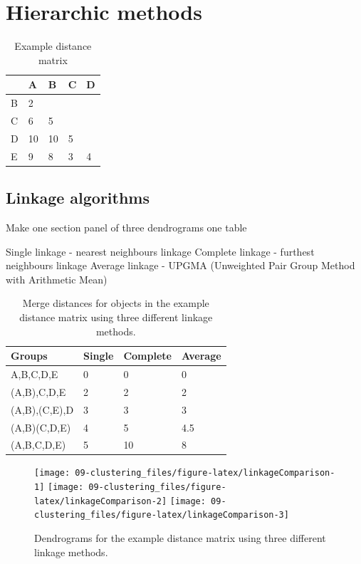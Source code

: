 \documentclass[]{book}
\theoremstyle{definition}
\theoremstyle{definition}
\theoremstyle{definition}
\theoremstyle{remark}
\begin{document}
\section{Hierarchic methods}\label{hierarchic-methods}

\begin{table}

\caption{\label{tab:distance-matrix}Example distance matrix}
\centering
\begin{tabular}[t]{lllll}
\toprule
  & A & B & C & D\\
\midrule
B & 2 &  &  & \\
C & 6 & 5 &  & \\
D & 10 & 10 & 5 & \\
E & 9 & 8 & 3 & 4\\
\bottomrule
\end{tabular}
\end{table}

\subsection{Linkage algorithms}\label{linkage-algorithms}

Make one section panel of three dendrograms one table

Single linkage - nearest neighbours linkage Complete linkage - furthest
neighbours linkage Average linkage - UPGMA (Unweighted Pair Group Method
with Arithmetic Mean)

\begin{table}

\caption{\label{tab:distance-merge}Merge distances for objects in the example distance matrix using three different linkage methods.}
\centering
\begin{tabular}[t]{llll}
\toprule
Groups & Single & Complete & Average\\
\midrule
A,B,C,D,E & 0 & 0 & 0\\
(A,B),C,D,E & 2 & 2 & 2\\
(A,B),(C,E),D & 3 & 3 & 3\\
(A,B)(C,D,E) & 4 & 5 & 4.5\\
(A,B,C,D,E) & 5 & 10 & 8\\
\bottomrule
\end{tabular}
\end{table}

\begin{figure}

{\centering \texttt{[image: 09-clustering\_files/figure-latex/linkageComparison-1]} \texttt{[image: 09-clustering\_files/figure-latex/linkageComparison-2]} \texttt{[image: 09-clustering\_files/figure-latex/linkageComparison-3]} 

}

\caption{Dendrograms for the example distance matrix using three different linkage methods. }\label{fig:linkageComparison}
\end{figure}
\end{document}
